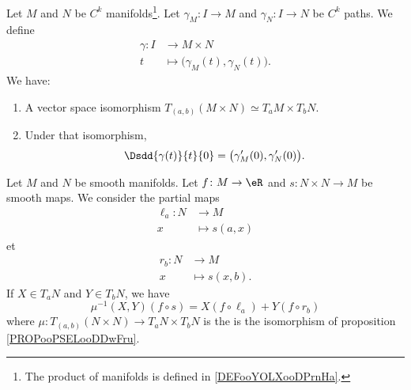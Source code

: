 \begin{lemma}       \label{LEMooTONEooFiysTA}
	Let \( M\) and \( N\) be \( C^k\) manifolds\footnote{The product of manifolds is defined in \ref{DEFooYOLXooDPrnHa}.}. Let \( \gamma_M\colon I\to M\) and \( \gamma_N\colon I\to N\) be \( C^k\) paths. We define
	\begin{equation}
		\begin{aligned}
			\gamma\colon I & \to M\times N                                \\
			t              & \mapsto \big( \gamma_M(t),\gamma_N(t) \big).
		\end{aligned}
	\end{equation}
	We have:
	\begin{enumerate}
		\item
		      A vector space isomorphism \( T_{(a,b)}(M\times N)\simeq T_aM\times T_bN\).
		\item
		      Under that isomorphism,
		      \begin{equation}
			      \Dsdd{ \gamma(t) }{t}{0}=\big( \gamma_M'(0),\gamma_N'(0) \big).
		      \end{equation}
	\end{enumerate}
\end{lemma}

\begin{proposition}	\label{PROPooJIFTooGboJoI}
	Let \( M\) and \( N\) be smooth manifolds. Let \(f \colon M\to \eR  \) and \(s \colon N\times N\to M  \) be smooth maps. We consider the partial maps
	\begin{equation}
		\begin{aligned}
			\ell_a\colon N & \to M          \\
			x              & \mapsto s(a,x)
		\end{aligned}
	\end{equation}
	et
	\begin{equation}
		\begin{aligned}
			r_b\colon N & \to M           \\
			x           & \mapsto s(x,b).
		\end{aligned}
	\end{equation}
	If \( X\in T_aN\) and \( Y\in T_bN\), we have
	\begin{equation}
		\mu^{-1}(X,Y)(f\circ s)=X(f\circ \ell_a)+Y(f\circ r_b)
	\end{equation}
	where \(\mu \colon T_{(a,b)}(N\times N)\to T_aN\times T_bN  \) is the is the isomorphism of proposition \eqref{PROPooPSELooDDwFru}.
\end{proposition}

